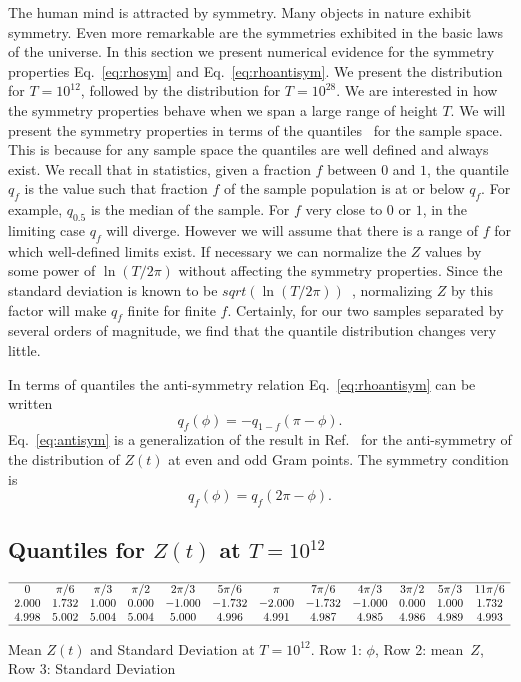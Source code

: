 \documentclass[twoside]{article}
\begin{document}
The human mind is attracted by symmetry. Many objects in nature exhibit symmetry.
Even more remarkable are the symmetries exhibited in the basic laws of the 
universe. In this section we present  numerical evidence for the symmetry properties
Eq.~\ref{eq:rhosym} and Eq.~\ref{eq:rhoantisym}. 
We  present the distribution for $T=10^{12}$, followed by the distribution for $T=10^{28}$.  
We are interested in how the symmetry properties behave when we span a large range of 
height $T$.
We will present the symmetry properties in terms of the quantiles~\cite{feller} 
for the sample space. This is because for any sample space the quantiles are well defined 
and always exist. We recall that in statistics, given a fraction $f$ between $0$ and $1$, 
the quantile $q_f$ is the value such that fraction $f$  of the sample population is 
at or below $q_f$. For example, $q_{0.5}$ is the median of the sample.
For $f$ very close to $0$ or $1$, in the limiting case $q_f$ will diverge. 
However we will assume that there is a range of $f$ for which well-defined limits exist. 
If necessary we can normalize the $Z$ values by some power of $\ln(T/2\pi)$ without 
affecting the symmetry properties. Since the standard deviation is 
known to be $sqrt(\ln(T/2\pi))$~\cite{Shanker 2018b}, 
normalizing $Z$ by this factor will make $q_f$ finite for finite $f$. 
Certainly, for our two samples separated by several orders of magnitude, 
we find that the quantile distribution changes very little. 

In terms of quantiles the anti-symmetry relation Eq.~\ref{eq:rhoantisym} 
can be written
\begin{equation}
q_{f}(\phi) = -q_{1-f}(\pi-\phi).
\label{eq:antisym}
\end{equation}
Eq.~\ref{eq:antisym}  is a generalization of the result in Ref.~\cite{Shanker 2018a} 
for the anti-symmetry of the distribution of $Z(t)$ at even and odd Gram points. 
The  symmetry condition is
\begin{equation}
q_{f}(\phi) = q_{f}(2\pi-\phi).
\label{eq:sym}
\end{equation}




\subsection{\label{E12}Quantiles for $Z(t)$ at $T=10^{12}$}


\begin{table}
\centering \(\begin{array}{cccccccccccc}

\hline
0&\pi/6 &\pi/3 &\pi/2 &2\pi/3 &5\pi/6 &\pi &7\pi/6 &4\pi/3 &3\pi/2 &5\pi/3 &11\pi/6 \\
2.000 &1.732 &1.000 &0.000 &-1.000 &-1.732 &-2.000 &-1.732 &-1.000 &0.000 &1.000 &1.732 \\
4.998&5.002&5.004&5.004&5.000&4.996&4.991&4.987&4.985&4.986&4.989&4.993 \\
\hline
\end{array}\)
\caption{Mean    $Z(t)$ and Standard Deviation at $T=10^{12}$. Row 1: $\phi$, Row 2: mean~$Z$, Row 3: Standard Deviation}
\label{tab:mean12}
\end{table}
\end{document}
